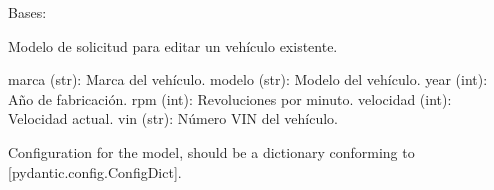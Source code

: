 \documentclass[letterpaper,10pt,spanish]{sphinxmanual}
\begin{document}
\begin{fulllineitems}
\label{\detokenize{modelos:main.VehiculoEdicion}}
\pysigstartsignatures
\pysiglinewithargsret
{}
{\sphinxparamcomma {}\sphinxparamcomma {}\sphinxparamcomma {}\sphinxparamcomma {}\sphinxparamcomma {}\sphinxparamcomma {}}
{}
\pysigstopsignatures
\sphinxAtStartPar
Bases: 

\sphinxAtStartPar
Modelo de solicitud para editar un vehículo existente.
\begin{description}
\sphinxAtStartPar
marca (str): Marca del vehículo.
modelo (str): Modelo del vehículo.
year (int): Año de fabricación.
rpm (int): Revoluciones por minuto.
velocidad (int): Velocidad actual.
vin (str): Número VIN del vehículo.

\end{description}

\begin{fulllineitems}
\label{\detokenize{modelos:main.VehiculoEdicion.model_config}}
\pysigstartsignatures
\pysigline
{}
\pysigstopsignatures
\sphinxAtStartPar
Configuration for the model, should be a dictionary conforming to {[}\sphinxtitleref{ConfigDict}{]}{[}pydantic.config.ConfigDict{]}.

\end{fulllineitems}


\end{fulllineitems}

\end{document}
